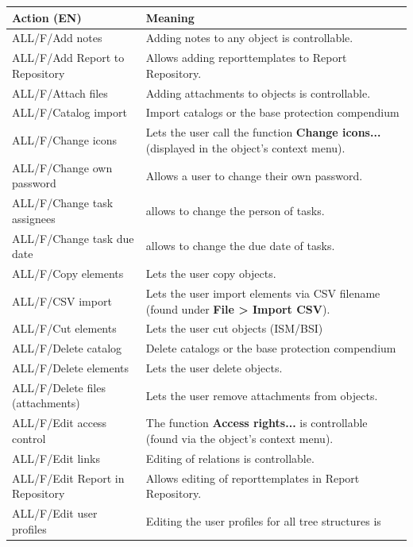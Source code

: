 \documentclass[a4paper,10pt]{book}
\begin{document}
\begin{longtable}{| p{5cm} | p{6cm} |}
\hline
\textbf{Action (EN)} & \textbf{Meaning}  \\[10pt] \hline
ALL/F/Add notes & Adding notes to any object is controllable. \\[10pt] \hline
ALL/F/Add Report to \newline Repository & Allows adding reporttemplates to
Report
Repository. \\[10pt] \hline
ALL/F/Attach files & Adding attachments to objects is controllable.  \\[10pt]
ALL/F/Catalog import & Import catalogs or the base protection compendium \\[10pt] \hline
\hline
ALL/F/Change icons & Lets the user call the function \textbf{Change icons...}
(displayed in the object's context menu). \\[10pt] \hline
ALL/F/Change own password & Allows a user to change their own password.\\[10pt]
\hline
ALL/F/Change task assignees & allows to change the person  of tasks. \\[10pt]
\hline
ALL/F/Change task due date & allows to change the due date of tasks. \\[10pt]
\hline
ALL/F/Copy elements & Lets the user copy objects. \\[10pt] \hline
ALL/F/CSV import & Lets the user import elements via CSV filename (found under
\textbf{File > Import CSV}). \\[10pt] \hline
ALL/F/Cut elements & Lets the user cut objects (ISM/BSI) \\[10pt] \hline
ALL/F/Delete catalog & Delete catalogs or the base protection compendium \\[10pt] \hline
ALL/F/Delete elements & Lets the user delete objects. \\[10pt] \hline
ALL/F/Delete files \newline (attachments) & Lets the user remove attachments
from
objects.  \\[10pt] \hline
ALL/F/Edit access control & The function \textbf{Access rights...} is
controllable (found via the object's context menu). \\[10pt] \hline
ALL/F/Edit links & Editing of relations is controllable. \\[10pt] \hline
ALL/F/Edit Report in \newline Repository & Allows editing of reporttemplates in
Report
Repository. \\[10pt] \hline
ALL/F/Edit user profiles & Editing the user profiles for all tree structures is

\end{longtable}
\end{document}
